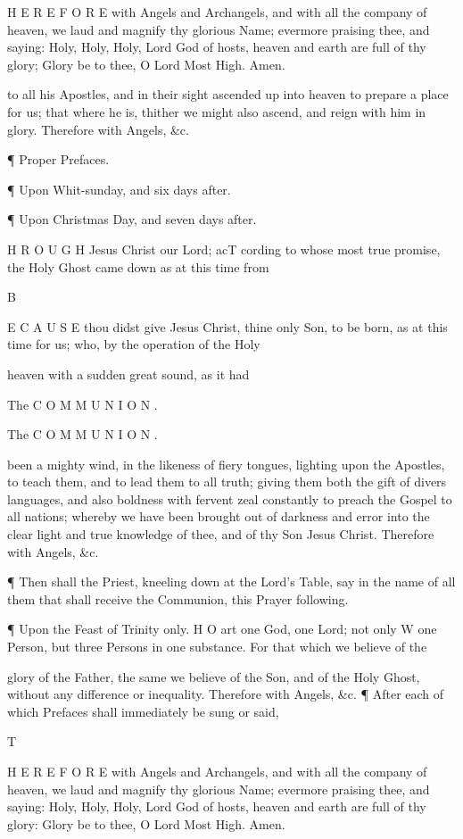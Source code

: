 H E R E F O R E with Angels and Archangels, and with all the company of heaven, we laud and magnify thy glorious Name; evermore praising thee, and saying: Holy, Holy, Holy, Lord God of hosts, heaven and earth are full of thy glory; Glory be to thee, O Lord Most High. Amen.

to all his Apostles, and in their sight ascended up into heaven to prepare a place for us; that where he is, thither we might also ascend, and reign with him in glory. Therefore with Angels, \&c.

¶ Proper Prefaces.

¶ Upon Whit-sunday, and six days after.

¶ Upon Christmas Day, and seven days after.

H R O U G H Jesus Christ our Lord; acT cording to whose most true promise, the Holy Ghost came down as at this time from

B

E C A U S E thou didst give Jesus Christ, thine only Son, to be born, as at this time for us; who, by the operation of the Holy

heaven with a sudden great sound, as it had

The C O M M U N I O N .

The C O M M U N I O N .

been a mighty wind, in the likeness of fiery tongues, lighting upon the Apostles, to teach them, and to lead them to all truth; giving them both the gift of divers languages, and also boldness with fervent zeal constantly to preach the Gospel to all nations; whereby we have been brought out of darkness and error into the clear light and true knowledge of thee, and of thy Son Jesus Christ. Therefore with Angels, \&c.

¶ Then shall the Priest, kneeling down at the Lord’s Table, say in the name of all them that shall receive the Communion, this Prayer following.

¶ Upon the Feast of Trinity only. H O art one God, one Lord; not only W one Person, but three Persons in one substance. For that which we believe of the

glory of the Father, the same we believe of the Son, and of the Holy Ghost, without any difference or inequality. Therefore with Angels, \&c. ¶ After each of which Prefaces shall immediately be sung or said,

T

H E R E F O R E with Angels and Archangels, and with all the company of heaven, we laud and magnify thy glorious Name; evermore praising thee, and saying: Holy, Holy, Holy, Lord God of hosts, heaven and earth are full of thy glory: Glory be to thee, O Lord Most High. Amen.

